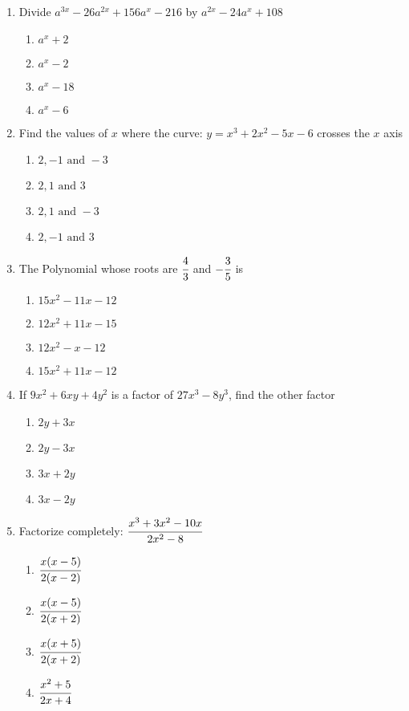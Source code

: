 \begin{multicols}{2}
\begin{enumerate}[label={\arabic*.}]
\begin{enumerate}[label={\Alph*.}]
	\end{enumerate}
\item Divide $a^{3x} - 26a^{2x} + 156a^x - 216 $ by $a^{2x} - 24a^x + 108$
	\begin{enumerate}[label={\Alph*.}]
	\item \( a^x + 2\)
	\item \(a^x - 2\)
	\item \(a^x -18\)
	\item \(a^x -6\)
	\end{enumerate}
\item Find the values of $x$ where the curve: $y = x^3 + 2x^2 -5x -6$ crosses the $x$ axis
	\begin{enumerate}[label={\Alph*.}]
	\item \(2, -1 \text{ and } -3\)
	\item \(2, 1 \text{ and } 3\)
	\item \(2, 1 \text{ and } -3\)
	\item \(2, -1 \text{ and } 3\)
	\end{enumerate}
\item The Polynomial whose roots are $\cfrac{4}{3}$ and $-\cfrac{3}{5}$ is
	\begin{enumerate}[label={\Alph*.}]
	\item \(15x^2 - 11x -12 \)
	\item \(12x^2 + 11x -15\)
	\item \(12x^2 - x -12\)
	\item \(15x^2 + 11x -12\)
	\end{enumerate}
\item If $9x^2 + 6xy + 4y^2$ is a factor of $27x^3 - 8y^3$, find the other factor
	\begin{enumerate}[label={\Alph*.}]
	\item \(2y + 3x\)
	\item \(2y - 3x\)
	\item \(3x + 2y\)
	\item \(3x - 2y\)
	\end{enumerate}
\item Factorize completely: $\cfrac{x^3 + 3x^2 -10x}{2x^2 - 8}$
	\begin{enumerate}[label={\Alph*.}]
	\item \(\cfrac{x(x-5)}{2(x-2)}\)
	\item \(\cfrac{x(x-5)}{2(x+2)}\)
	\item \(\cfrac{x(x+5)}{2(x+2)}\)
	\item \(\cfrac{x^2 + 5}{2x + 4}\)
	\end{enumerate}

\end{enumerate}
\end{multicols}

